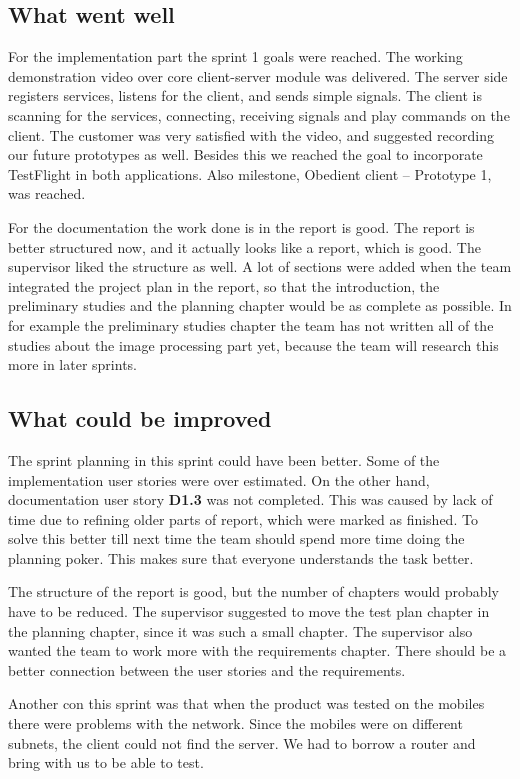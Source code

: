 \subsection{What went well}
For the implementation part the sprint 1 goals were reached. The working demonstration video over core client-server module was delivered. The server side registers services, listens for the client, and sends simple  signals. The client is scanning for the services, connecting, receiving signals and play commands on the client. The customer was very satisfied with the video, and suggested recording our future prototypes as well. Besides this we reached the goal to incorporate TestFlight in both applications. Also milestone, Obedient client -- Prototype 1, was reached.

For the documentation the work done is in the report is good. 
The report is better structured now, and it actually looks like a report, which is good. 
The supervisor liked the structure as well. A lot of sections were added when the team integrated the project plan in the report, so that the introduction, the preliminary studies and the planning chapter would be as complete as possible. In for example the preliminary studies chapter the team has not written all of the studies about the image processing part yet, because the team will research this more in later sprints.


\subsection{What could be improved}
The sprint planning in this sprint could have been better. Some of the implementation user stories were over estimated. 
On the other hand, documentation user story \textbf{D1.3} was not completed. 
This was caused by lack of time due to refining older parts of report, which were marked as finished.
To solve this better till next time the team should spend more time doing the planning poker. 
This makes sure that everyone understands the task better. 

The structure of the report is good, but the number of chapters would probably have to be reduced. The supervisor suggested to move the test plan chapter in the planning chapter, since it was such a small chapter. The supervisor also wanted the team to work more with the requirements chapter. There should be a better connection between the user stories and the requirements.


Another con this sprint was that when the product was tested on the mobiles there were problems with the network. Since the mobiles were on different subnets, the client could not find the server. We had to borrow a router and bring with us to be able to test. 

